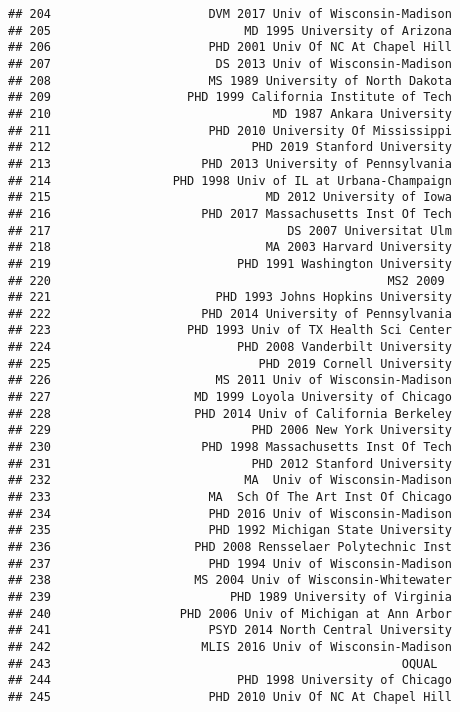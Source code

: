 \documentclass[
]{article}
\begin{document}
\begin{verbatim}
## 204                      DVM 2017 Univ of Wisconsin-Madison
## 205                           MD 1995 University of Arizona
## 206                      PHD 2001 Univ Of NC At Chapel Hill
## 207                       DS 2013 Univ of Wisconsin-Madison
## 208                      MS 1989 University of North Dakota
## 209                   PHD 1999 California Institute of Tech
## 210                               MD 1987 Ankara University
## 211                      PHD 2010 University Of Mississippi
## 212                            PHD 2019 Stanford University
## 213                     PHD 2013 University of Pennsylvania
## 214                 PHD 1998 Univ of IL at Urbana-Champaign
## 215                              MD 2012 University of Iowa
## 216                     PHD 2017 Massachusetts Inst Of Tech
## 217                                 DS 2007 Universitat Ulm
## 218                              MA 2003 Harvard University
## 219                          PHD 1991 Washington University
## 220                                               MS2 2009 
## 221                       PHD 1993 Johns Hopkins University
## 222                     PHD 2014 University of Pennsylvania
## 223                   PHD 1993 Univ of TX Health Sci Center
## 224                          PHD 2008 Vanderbilt University
## 225                             PHD 2019 Cornell University
## 226                       MS 2011 Univ of Wisconsin-Madison
## 227                    MD 1999 Loyola University of Chicago
## 228                    PHD 2014 Univ of California Berkeley
## 229                            PHD 2006 New York University
## 230                     PHD 1998 Massachusetts Inst Of Tech
## 231                            PHD 2012 Stanford University
## 232                           MA  Univ of Wisconsin-Madison
## 233                      MA  Sch Of The Art Inst Of Chicago
## 234                      PHD 2016 Univ of Wisconsin-Madison
## 235                      PHD 1992 Michigan State University
## 236                    PHD 2008 Rensselaer Polytechnic Inst
## 237                      PHD 1994 Univ of Wisconsin-Madison
## 238                    MS 2004 Univ of Wisconsin-Whitewater
## 239                         PHD 1989 University of Virginia
## 240                  PHD 2006 Univ of Michigan at Ann Arbor
## 241                      PSYD 2014 North Central University
## 242                     MLIS 2016 Univ of Wisconsin-Madison
## 243                                                 OQUAL  
## 244                          PHD 1998 University of Chicago
## 245                      PHD 2010 Univ Of NC At Chapel Hill

\end{verbatim}
\end{document}
